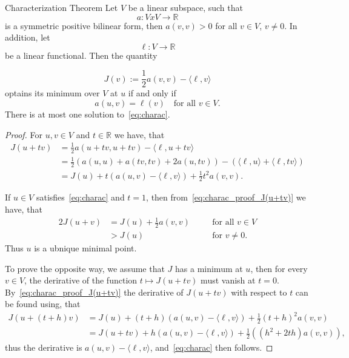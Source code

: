 
\begin{thmx}{Characterization Theorem}
    Let $V$ be a linear subspace, such that
        \[
            a: VxV \rightarrow \mathbb{R}
        \]
    is a symmetric positive bilinear form, then $a(v,v)>0$ for all $v \in V$, $v \neq 0$. In addition, let
        \[
            \ell: V \rightarrow \mathbb{R}
        \]
    be a linear functional. Then the quantity

        \[
            J(v):=\frac{1}{2} a(v,v) - \langle\ell,v\rangle 
        \]
    optains its minimum over $V$ at $u$ if and only if
        \begin{equation}
        \label{eq:charac}
            a(u,v) = \ell(v) \quad \text{for all } v \in V.
        \end{equation}
    There is at most one solution to~\eqref{eq:charac}.
\end{thmx}

\begin{proof}

    For $u,v \in V$ and $t \in \mathbb{R}$ we have, that
    \begin{align}
        J(u+tv) &= \frac{1}{2} a(u+tv,u+tv) - \langle\ell,u+tv\rangle \nonumber \\
        &= \frac{1}{2} \left( a(u,u) + a(tv,tv) + 2a(u,tv) \right) - \left( \langle \ell,u\rangle + \langle\ell,tv\rangle \right) \nonumber \\
        &= J(u) + t\left( a(u,v) - \langle\ell,v\rangle \right) + \frac{1}{2}t^2a(v,v). \label{eq:charac_proof_J(u+tv)}
    \end{align}

    If $u \in V$ satisfies~\eqref{eq:charac} and $t=1$, then from~\eqref{eq:charac_proof_J(u+tv)} we have, that
    \begin{alignat}{2}
        J(u+v) &= J(u) + \frac{1}{2}a(v,v) \quad &&\text{for all } v\in V  \nonumber \\
        &> J(u) \quad &&\text{for } v \neq 0.
    \end{alignat}
    Thus $u$ is a ubnique minimal point. 

    To prove the opposite way, we assume that $J$ has a minimum at $u$, then for every $v\in V$, the derirative of the function $t \mapsto J(u+tv)$ must vanish at $t=0$. 
    By~\eqref{eq:charac_proof_J(u+tv)} the derirative of $J(u+tv)$ with respect to $t$ can be found using, that
    \begin{align*}
          J(u+(t+h)v) &= J(u) + (t+h) (a(u,v) - \langle \ell,v\rangle) + \frac{1}{2}(t+h)^2 a(v,v) \\
          &= J(u+tv) + h(a(u,v) - \langle \ell,v\rangle) + \frac{1}{2}((h^2+2th)a(v,v)),
    \end{align*}
    thus the derirative is $a(u,v) - \langle \ell,v\rangle$, and~\eqref{eq:charac} then follows.
\end{proof}